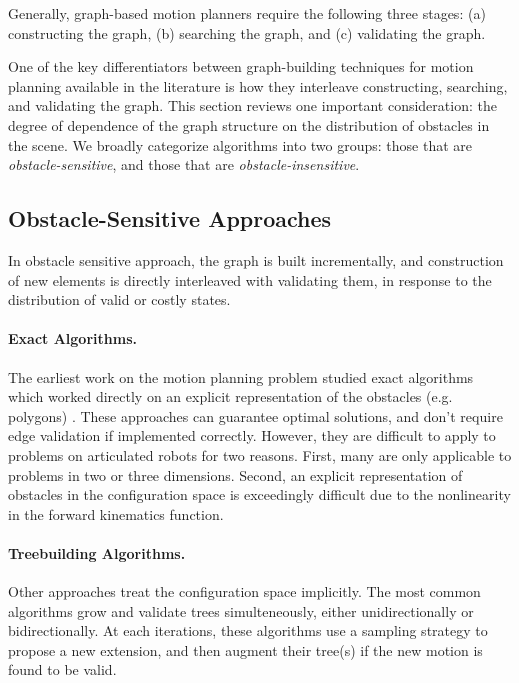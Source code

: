 Generally,
graph-based motion planners require the following three stages:
(a) constructing the graph,
(b) searching the graph, and
(c) validating the graph.

One of the key differentiators between graph-building techniques
for motion planning available in the literature
is how they interleave constructing, searching, and validating
the graph.
This section reviews one important consideration:
the degree of dependence of the graph structure
on the distribution of obstacles in the scene.
We broadly categorize algorithms into two groups:
those that are \emph{obstacle-sensitive},
and those that are \emph{obstacle-insensitive}.

\subsection{Obstacle-Sensitive Approaches}
\label{subsec:roadmaps:sensitive}

In obstacle sensitive approach,
the graph is built incrementally,
and construction of new elements
is directly interleaved with validating them,
in response to the distribution of valid or costly states.

\paragraph{Exact Algorithms.}
The earliest work on the motion planning problem studied exact
algorithms which worked directly on an explicit representation
of the obstacles (e.g. polygons) \citep{lozanoperez1983cspace}.
These approaches can guarantee optimal solutions,
and don't require edge validation if implemented correctly.
However,
they are difficult to apply to problems on articulated
robots for two reasons.
First, many are only applicable to problems in two or three dimensions.
Second, an explicit representation of obstacles in the
configuration space is exceedingly difficult due to the
nonlinearity in the forward kinematics function.

\paragraph{Treebuilding Algorithms.}
Other approaches treat the configuration space implicitly.
The most common algorithms grow and validate trees simulteneously,
either unidirectionally or bidirectionally.
At each iterations,
these algorithms use a sampling strategy to propose a new extension,
and then augment their tree(s) if the new motion is found to be valid.

